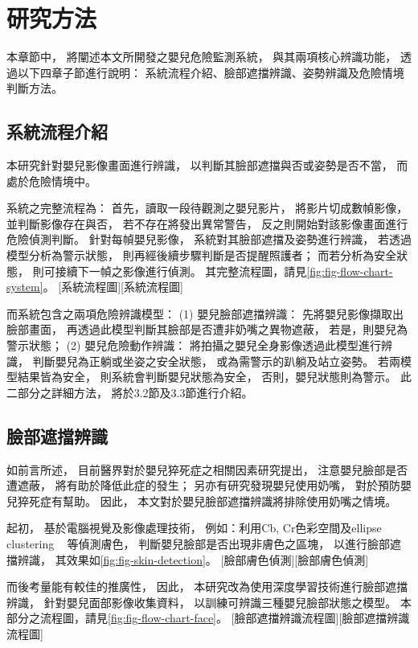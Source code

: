 \documentclass[class=NCU_thesis, crop=false]{standalone}
\begin{document}
\chapter{研究方法}
本章節中，
將闡述本文所開發之嬰兒危險監測系統，
與其兩項核心辨識功能，
透過以下四章子節進行說明：
系統流程介紹、臉部遮擋辨識、姿勢辨識及危險情境判斷方法。

\section{系統流程介紹}
本研究針對嬰兒影像畫面進行辨識，
以判斷其臉部遮擋與否或姿勢是否不當，
而處於危險情境中。

系統之完整流程為：
首先，讀取一段待觀測之嬰兒影片，
將影片切成數幀影像，
並判斷影像存在與否，
若不存在將發出異常警告，
反之則開始對該影像畫面進行危險偵測判斷。
針對每幀嬰兒影像，
系統對其臉部遮擋及姿勢進行辨識，
若透過模型分析為警示狀態，
則再經後續步驟判斷是否提醒照護者；
而若分析為安全狀態，
則可接續下一幀之影像進行偵測。
其完整流程圖，請見\cref{fig:fig-flow-chart-system}。
[系統流程圖][系統流程圖]

而系統包含之兩項危險辨識模型：
(1) 嬰兒臉部遮擋辨識：
先將嬰兒影像擷取出臉部畫面，
再透過此模型判斷其臉部是否遭非奶嘴之異物遮蔽，
若是，則嬰兒為警示狀態；
(2) 嬰兒危險動作辨識：
將拍攝之嬰兒全身影像透過此模型進行辨識，
判斷嬰兒為正躺或坐姿之安全狀態，
或為需警示的趴躺及站立姿勢。
若兩模型結果皆為安全，
則系統會判斷嬰兒狀態為安全，
否則，嬰兒狀態則為警示。
此二部分之詳細方法，
將於3.2節及3.3節進行介紹。

\section{臉部遮擋辨識}
如前言所述，
目前醫界對於嬰兒猝死症之相關因素研究提出，
注意嬰兒臉部是否遭遮蔽，
將有助於降低此症的發生；
另亦有研究發現嬰兒使用奶嘴，
對於預防嬰兒猝死症有幫助。
因此，
本文對於嬰兒臉部遮擋辨識將排除使用奶嘴之情境。

起初，
基於電腦視覺及影像處理技術，
例如：利用Cb, Cr色彩空間及ellipse clustering
~\cite{tang_hands_2008, li_face_2011, noauthor_python_nodate, walkonnet_python_nodate}
等偵測膚色，
判斷嬰兒臉部是否出現非膚色之區塊，
以進行臉部遮擋辨識，
其效果如\cref{fig:fig-skin-detection}。
[臉部膚色偵測][臉部膚色偵測]

而後考量能有較佳的推廣性，
因此，
本研究改為使用深度學習技術進行臉部遮擋辨識，
針對嬰兒面部影像收集資料，
以訓練可辨識三種嬰兒臉部狀態之模型。
本部分之流程圖，請見\cref{fig:fig-flow-chart-face}。
[臉部遮擋辨識流程圖][臉部遮擋辨識流程圖]
\end{document}
